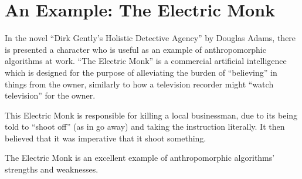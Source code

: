 \section{An Example: The Electric Monk}
In the novel ``Dirk Gently's Holistic Detective Agency'' by Douglas Adams, there is presented a character who is useful as an example of anthropomorphic algorithms at work. ``The Electric Monk'' is a commercial artificial intelligence which is designed for the purpose of alleviating the burden of ``believing'' in things from the owner, similarly to how a television recorder might ``watch television'' for the owner.\par

This Electric Monk is responsible for killing a local businessman, due to its being told to ``shoot off'' (as in go away) and taking the instruction literally. It then believed that it was imperative that it shoot something.\par

\medskip

The Electric Monk is an excellent example of anthropomorphic algorithms' strengths and weaknesses.
